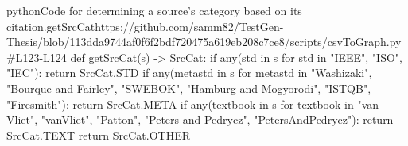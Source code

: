 \begin{codeSnippet}{python}{Code for determining a source's category based on its citation.}{getSrcCat}{https://github.com/samm82/TestGen-Thesis/blob/113dda9744af0f6f2bdf720475a619eb208c7ce8/scripts/csvToGraph.py\#L123-L124}
def getSrcCat(s) -> SrcCat:
    if any(std in s for std in {"IEEE", "ISO", "IEC"}):
        return SrcCat.STD
    if any(metastd in s for metastd in
        {"Washizaki", "Bourque and Fairley", "SWEBOK",
            "Hamburg and Mogyorodi", "ISTQB", "Firesmith"}):
        return SrcCat.META
    if any(textbook in s for textbook in
        {"van Vliet", "vanVliet", "Patton", "Peters and Pedrycz",
            "PetersAndPedrycz"}):
        return SrcCat.TEXT
    return SrcCat.OTHER
\end{codeSnippet}

\mainInvalidInputTest{}

\projViolationChoice{}

\projManualViolationReq{}

\exampleCode{}

\examplePseudocode{}
